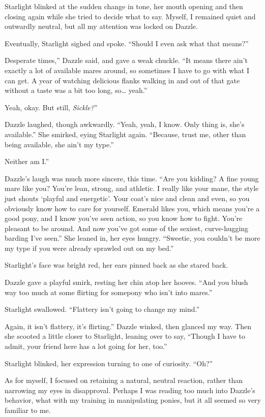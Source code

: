Starlight blinked at the sudden change in tone, her mouth opening and then closing again while she tried to decide what to say. Myself, I remained quiet and outwardly neutral, but all my attention was locked on Dazzle.

Eventually, Starlight sighed and spoke. “Should I even ask what that means?”

\leavevmode{}Desperate times,” Dazzle said, and gave a weak chuckle. “It means there ain’t exactly a lot of available mares around, so sometimes I have to go with what I can get. A year of watching delicious flanks walking in and out of that gate without a taste was a bit too long, so… yeah.”

\leavevmode{}Yeah, okay. But still, \textit{Sickle?}”

Dazzle laughed, though awkwardly. “Yeah, yeah, I know. Only thing is, she’s available.” She smirked, eying Starlight again. “Because, trust me, other than being available, she ain’t my type.”

\leavevmode{}Neither am I.”

Dazzle’s laugh was much more sincere, this time. “Are you kidding? A fine young mare like you? You’re lean, strong, and athletic. I really like your mane, the style just shouts ‘playful and energetic’. Your coat’s nice and clean and even, so you obviously know how to care for yourself. Emerald likes you, which means you’re a good pony, and I know you’ve seen action, so you know how to fight. You’re pleasant to be around. And now you’ve got some of the sexiest, curve-hugging barding I’ve seen.” She leaned in, her eyes hungry. “Sweetie, you couldn’t be more my type if you were already sprawled out on my bed.”

Starlight’s face was bright red, her ears pinned back as she stared back.

Dazzle gave a playful smirk, resting her chin atop her hooves. “And you blush way too much at some flirting for somepony who isn’t into mares.”

Starlight swallowed. “Flattery isn’t going to change my mind.”

\leavevmode{}Again, it isn’t flattery, it’s flirting.” Dazzle winked, then glanced my way. Then she scooted a little closer to Starlight, leaning over to say, “Though I have to admit, your friend here has a lot going for her, too.”

Starlight blinked, her expression turning to one of curiosity. “Oh?”

As for myself, I focused on retaining a natural, neutral reaction, rather than narrowing my eyes in disapproval. Perhaps I was reading too much into Dazzle’s behavior, what with my training in manipulating ponies, but it all seemed so very familiar to me.

